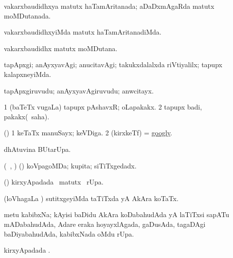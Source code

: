 \begin{center}
\bentry
{} 
\gl{\gu}
\expl{}
\bmng
vakarxbaudidhxya matutx haTamAritanada; aDaDxmAgaRda matutx moMDutanada. 
\emng
\eentry

\bentry
{} 
\gl{\kirxvi}
\expl{}
\bmng
vakarxbaudidhxyiMda matutx haTamAritanadiMda. 
\emng
\eentry

\bentry
{} 
\gl{\nA}
\expl{}
\bmng
vakarxbaudidhx matutx moMDutana. 
\emng
\eentry

\bentry
{} 
\gl{\kirxvi}
\expl{}
\bmng
tapApxgi; anAyxyavAgi; anucitavAgi; takukxdalalxda riVtiyalilx; tapupx kalapxneyiMda. 
\emng
\eentry

\bentry
{} 
\gl{\nA}
\expl{}
\bmng
tapApxgiruvudu; anAyxyavAgiruvudu; anwcitayx. 
\emng
\eentry

\bentry
{} 
\gl{\nA}
\expl{}
\bmng
\bnum
\num{1} (baTeTx \mo vugaLa) tapupx pAshavxR; oLapakakx. 
\num{2} tapupx badi, pakakx(\rUpa\ saha). 
\enum
\emng
\eentry

\bentry
{} 
\gl{\nA}
\expl{}
\bmng
(\AmA) 
\bnum
\num{1} keTaTx manuSayx; keVDiga. 
\num{2} (kirxkeTf) = \hyperref{kandict_g.pdf}{G}{googly}{googly}. 
\enum
\emng
\eentry

\bentry
{} 
\gl{\kirx}
\expl{}
\bmng
{} dhAtuvina BUtarUpa. 
\emng
\eentry

\bentry
{} 
\gl{\gu}
\expl{}
\bmng
(\rUpa\, \kAparx, \hA) (\pArxparx) koVpagoMDa; kupita; siTiTxgedadx. 
\emng
\eentry

\bentry
{} 
\gl{\kirx}
\expl{}
\bmng
(\pArxparx)  kirxyApadada \BU\ matutx \BUkaq\ rUpa. 
\emng
\eentry

\bentry
{} 
\gl{\gu}
\expl{}
\bmng
(loVhagaLa \vi) sutitxgeyiMda taTiTxda yA AkAra koTaTx. 
\emng
\eentry

\bentry
{} 
\gl{\nA}
\expl{}
\bmng
metu kabibxNa; kAyisi baDidu AkAra koDabahudAda yA laTiTxsi sapATu mADabahudAda, Adare eraka hoyayxlAgada, gaDusAda, tagaDAgi baDiyabahudAda, kabibxNada oMdu rUpa. 
\emng
\eentry

\bentry
{} 
\gl{\kirx}
\expl{}
\bmng
{} kirxyApadada \BUkaq. 
\emng
\eentry

\bentry
{} 
\gl{\saMkiSx}
\expl{}
\bmng
\eng{(} \birx\  
\emng
\eentry


\end{center}

